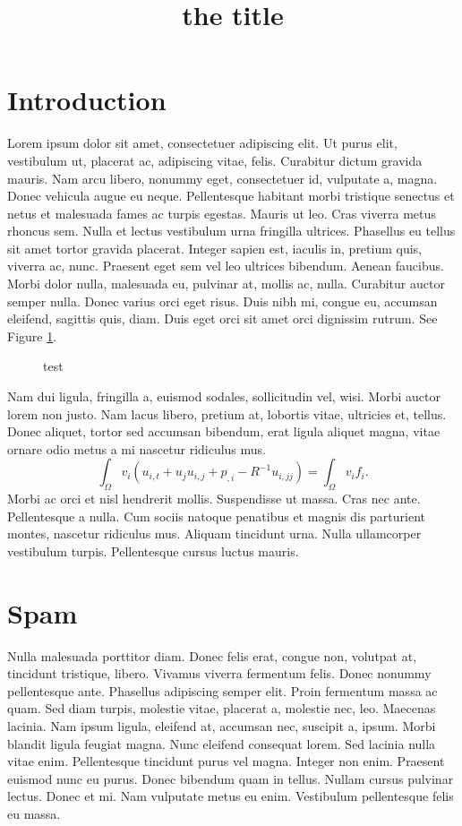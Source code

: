 \documentclass{tudelftposter}
\title{the title}
\begin{document}
\section{Introduction}

Lorem ipsum dolor sit amet, consectetuer adipiscing elit. Ut purus elit,
vestibulum ut, placerat ac, adipiscing vitae, felis. Curabitur dictum gravida
mauris. Nam arcu libero, nonummy eget, consectetuer id, vulputate a, magna.
Donec vehicula augue eu neque. Pellentesque habitant morbi tristique senectus et
netus et malesuada fames ac turpis egestas. Mauris ut leo. Cras viverra metus
rhoncus sem. Nulla et lectus vestibulum urna fringilla ultrices.  Phasellus eu
tellus sit amet tortor gravida placerat. Integer sapien est, iaculis in, pretium
quis, viverra ac, nunc. Praesent eget sem vel leo ultrices bibendum. Aenean
faucibus.  Morbi dolor nulla, malesuada eu, pulvinar at, mollis ac, nulla.
Curabitur auctor semper nulla. Donec varius orci eget risus. Duis nibh mi,
congue eu, accumsan eleifend, sagittis quis, diam. Duis eget orci sit amet orci
dignissim rutrum.  See Figure \ref{fig:test}.

\begin{figure}
  \centering
  \framebox{\rule{0pt}{5cm}\rule{5cm}{0pt}}
  \caption{test}
  \label{fig:test}
\end{figure}

Nam dui ligula, fringilla a, euismod sodales, sollicitudin vel, wisi. Morbi
auctor lorem non justo. Nam lacus libero, pretium at, lobortis vitae, ultricies
et, tellus. Donec aliquet, tortor sed accumsan bibendum, erat ligula aliquet
magna, vitae ornare odio metus a mi nascetur ridiculus mus.
\begin{equation}
  \int_\Omega v_i \left(
    u_{i,t} + u_j u_{i,j} + p_{,i} - R^{-1} u_{i,jj}
  \right) =
  \int_\Omega v_i f_i.
\end{equation}
Morbi ac orci et nisl hendrerit mollis.  Suspendisse ut massa. Cras nec ante.
Pellentesque a nulla.  Cum sociis natoque penatibus et magnis dis parturient
montes, nascetur ridiculus mus. Aliquam tincidunt urna. Nulla ullamcorper
vestibulum turpis. Pellentesque cursus luctus mauris.

\section{Spam}

Nulla malesuada porttitor diam. Donec felis erat, congue non, volutpat at,
tincidunt tristique, libero. Vivamus viverra fermentum felis. Donec nonummy
pellentesque ante. Phasellus adipiscing semper elit. Proin fermentum massa ac
quam. Sed diam turpis, molestie vitae, placerat a, molestie nec, leo. Maecenas
lacinia. Nam ipsum ligula, eleifend at, accumsan nec, suscipit a, ipsum.  Morbi
blandit ligula feugiat magna. Nunc eleifend consequat lorem. Sed lacinia nulla
vitae enim. Pellentesque tincidunt purus vel magna. Integer non enim. Praesent
euismod nunc eu purus. Donec bibendum quam in tellus. Nullam cursus pulvinar
lectus. Donec et mi.  Nam vulputate metus eu enim. Vestibulum pellentesque felis
eu massa.
\end{document}
